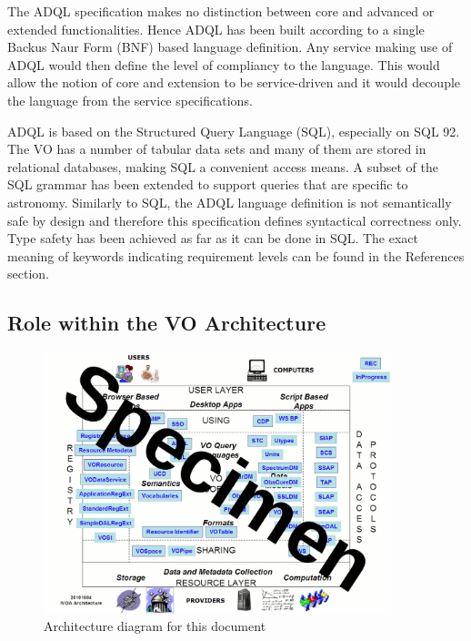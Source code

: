 \documentclass[11pt,a4paper]{ivoa}
\begin{document}
The ADQL specification makes no distinction between core and advanced or
extended functionalities. Hence ADQL has been built according to a single
Backus Naur Form (BNF) based language definition. Any service making use of ADQL would
then define the level of compliancy to the language. This would allow the
notion of core and extension to be service-driven and it would decouple the
language from the service specifications.

ADQL is based on the Structured Query Language (SQL), especially on SQL 92. The
VO has a number of tabular data sets and many of them are stored in relational
databases, making SQL a convenient access means. A subset of the SQL grammar
has been extended to support queries that are specific to astronomy. Similarly
to SQL, the ADQL language definition is not semantically safe by design and
therefore this specification defines syntactical correctness only. Type safety
has been achieved as far as it can be done in SQL. The exact meaning of keywords
indicating requirement levels can be found in the References section.

\clearpage
\subsection{Role within the VO Architecture}
\label{sec:role}

\begin{figure}
\centering
\includegraphics[width=0.9\textwidth]{archdiag.png}
\caption{Architecture diagram for this document}
\label{fig:archdiag}
\end{figure}
\end{document}
